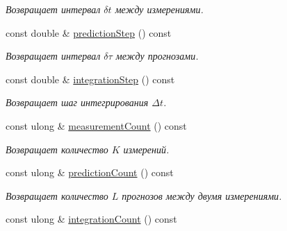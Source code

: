 \begin{DoxyCompactItemize}
\begin{DoxyCompactList}\small\item\em Возвращает интервал $\delta t$ между измерениями. \end{DoxyCompactList}\item 
const double \& \hyperlink{class_core_1_1_filter_parameters_ae4adb72b26c25f38673e0a573b1e3a36}{prediction\+Step} () const \hypertarget{class_core_1_1_filter_parameters_ae4adb72b26c25f38673e0a573b1e3a36}{}\label{class_core_1_1_filter_parameters_ae4adb72b26c25f38673e0a573b1e3a36}

\begin{DoxyCompactList}\small\item\em Возвращает интервал $\delta \tau$ между прогнозами. \end{DoxyCompactList}\item 
const double \& \hyperlink{class_core_1_1_filter_parameters_aeb2ccbc82692341b2831aeea8a96dcfd}{integration\+Step} () const \hypertarget{class_core_1_1_filter_parameters_aeb2ccbc82692341b2831aeea8a96dcfd}{}\label{class_core_1_1_filter_parameters_aeb2ccbc82692341b2831aeea8a96dcfd}

\begin{DoxyCompactList}\small\item\em Возвращает шаг интегрирования $\Delta t$. \end{DoxyCompactList}\item 
const ulong \& \hyperlink{class_core_1_1_filter_parameters_ace491a0120f53d874ee20fbce9e30735}{measurement\+Count} () const \hypertarget{class_core_1_1_filter_parameters_ace491a0120f53d874ee20fbce9e30735}{}\label{class_core_1_1_filter_parameters_ace491a0120f53d874ee20fbce9e30735}

\begin{DoxyCompactList}\small\item\em Возвращает количество $K$ измерений. \end{DoxyCompactList}\item 
const ulong \& \hyperlink{class_core_1_1_filter_parameters_afee5fdf7c715c7e10f776581382f6f43}{prediction\+Count} () const \hypertarget{class_core_1_1_filter_parameters_afee5fdf7c715c7e10f776581382f6f43}{}\label{class_core_1_1_filter_parameters_afee5fdf7c715c7e10f776581382f6f43}

\begin{DoxyCompactList}\small\item\em Возвращает количество $L$ прогнозов между двумя измерениями. \end{DoxyCompactList}\item 
const ulong \& \hyperlink{class_core_1_1_filter_parameters_af1e572c3791e4501f85fdfde72c2e198}{integration\+Count} () const \hypertarget{class_core_1_1_filter_parameters_af1e572c3791e4501f85fdfde72c2e198}{}\label{class_core_1_1_filter_parameters_af1e572c3791e4501f85fdfde72c2e198}


\end{DoxyCompactItemize}
